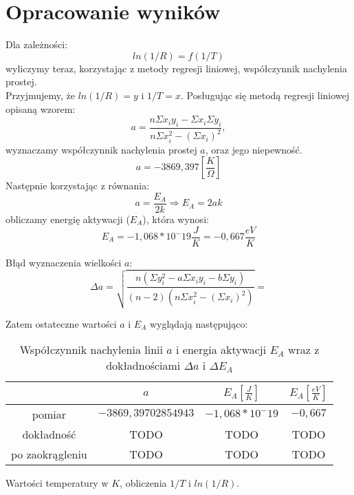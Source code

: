 \documentclass[10pt,a4paper]{article}
\newcommand{\forceindent}{\leavevmode{\parindent=3em\indent}}
\begin{document}
\section{Opracowanie wyników}
\forceindent Dla zależności:
\begin{equation}
ln(1/R) = f(1/T)
\end{equation}  
wyliczymy teraz, korzystając z metody regresji liniowej, współczynnik nachylenia prostej.\\
Przyjmujemy, że $ln(1/R) = y$ i $1/T = x$.
Posługując się metodą regresji liniowej opisaną wzorem:
\begin{equation}
a=\frac{n\Sigma x_i y_i - \Sigma x_i \Sigma y_i}{n\Sigma x_i^2 - (\Sigma x_i)^2},
\end{equation}
wyznaczamy współczynnik nachylenia prostej $a$, oraz jego niepewność. 
\begin{equation}
a = -3869,397 \left[\frac{K}{\Omega}\right]
\end{equation}
Następnie korzystając z równania:
\begin{equation}
a = \frac{E_A}{2k} \Rightarrow E_A = 2ak
\end{equation}
obliczamy energię aktywacji ($E_A$), która wynosi:
$$ E_A = -1,068 * 10^-19 \frac{J}{K} = -0,667 \frac{eV}{K} $$

Błąd wyznaczenia wielkości $a$:\\
$$ \Delta a = \sqrt{\frac{n(\Sigma y_i ^2 - a \Sigma x_i y_i - b\Sigma y_i)}{(n-2)(n \Sigma x_i ^2 - (\Sigma x_i)^2)}} = $$


\forceindent Zatem ostateczne wartości $a$ i $E_A$ wyglądają następująco:

\begin{table}[!h]
\centering
\begin{tabular}{|cc||c|c|}
\multicolumn{1}{c}{} & \multicolumn{1}{c}{$a$} & \multicolumn{1}{c}{$E_A [\frac{J}{K}]$} & \multicolumn{1}{c}{$E_A [\frac{eV}{K}]$}\\
\hline
pomiar & $-3869,39702854943$ & $-1,068 * 10^-19$ & $-0,667$\\
\hline
dokładność & TODO & TODO & TODO\\
\hline
po zaokrągleniu & TODO  & TODO & TODO\\
\hline
\end{tabular}
\caption{Współczynnik nachylenia linii $a$ i energia aktywacji $E_A$ wraz z dokładnościami $\Delta a$ i $\Delta E_A$}
\end{table}

\forceindent Wartości temperatury w $K$, obliczenia $1/T$ i $ln(1/R)$.
\end{document}
